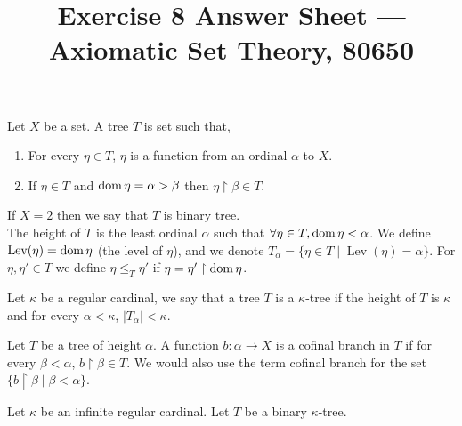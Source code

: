 
\title{Exercise 8 Answer Sheet --- Axiomatic Set Theory, 80650}

\DeclareMathOperator{\crit}{crit}


\maketitle
\maketitleprint{}

\question{}
\begin{definition}
	Let $X$ be a set. A tree $T$ is set such that,
	\begin{enumerate}
		\item For every $\eta \in T$, $\eta$ is a function from an ordinal $\alpha$ to $X$.
		\item If $\eta \in T$ and $\operatorname{dom} \eta = \alpha > \beta$ then $\eta \restriction \beta \in T$.
	\end{enumerate}
	If $X = 2$ then we say that $T$ is binary tree. \\
	The height of $T$ is the least ordinal $\alpha$ such that $\forall \eta \in T, \operatorname{dom} \eta < \alpha$.
	We define $\operatorname{Lev}(\eta) = \operatorname{dom} \eta$ (the level of $\eta$), and we denote $T_\alpha = \{\eta \in T \mid \operatorname{Lev}(\eta) = \alpha\}$.
	For $\eta, \eta' \in T$ we define $\eta \le_T \eta'$ if $\eta = \eta' \restriction \operatorname{dom} \eta$.
\end{definition}
\begin{definition}
	Let $\kappa$ be a regular cardinal, we say that a tree $T$ is a $\kappa$-tree if the height of $T$ is $\kappa$ and for every $\alpha < \kappa$, $|T_\alpha| < \kappa$.
\end{definition}
\begin{definition}
	Let $T$ be a tree of height $\alpha$.
	A function $b : \alpha \to X$ is a cofinal branch in $T$ if for every $\beta < \alpha$, $b \restriction \beta \in T$.
	We would also use the term cofinal branch for the set $\{ b \restriction \beta \mid \beta < \alpha \}$.
\end{definition}

Let $\kappa$ be an infinite regular cardinal.
Let $T$ be a binary $\kappa$-tree.

